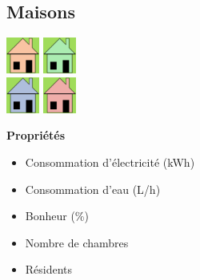 \documentclass[11pt]{report}
\begin{document}
\subsection{Maisons}
\begin{center}
	\begin{minipage}{0.25\textwidth}
		\begin{flushright}
			\includegraphics[height=45px]{house_beige}
			\includegraphics[height=45px]{house_green}\\
			\includegraphics[height=45px]{house_blue}
			\includegraphics[height=45px]{house_pink}
		\end{flushright}
	\end{minipage}
	\begin{minipage}{0.7\textwidth}
		\textbf{Propriétés}
		\begin{itemize}
			\item Consommation d'électricité (kWh)
			\item Consommation d'eau (L/h)
			\item Bonheur (\%)
			\item Nombre de chambres
			\item Résidents
		\end{itemize}
	\end{minipage}
\end{center}
\end{document}
